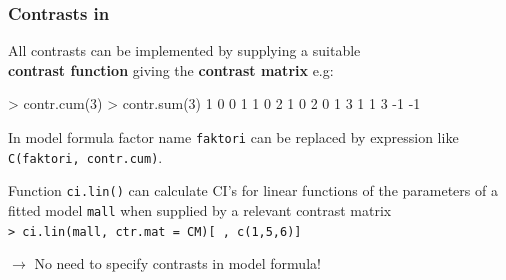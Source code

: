 \documentclass[12pt,dvipsnames,t,handout%
,aspectratio=169%
]{beamer}
\begin{document}
\begin{frame}[fragile]

\frametitle{Contrasts in \R}

\bi
\item
All contrasts can be implemented by supplying a suitable  \\
{\bf contrast function} giving the {\bf contrast matrix} e.g:
{\small
\begin{semiverbatim}
{> contr.cum(3)}        {> contr.sum(3)}
1 0 0                  1    1   0    
2 1 0                  2    0   1   
3 1 1                  3   -1  -1   
\end{semiverbatim}
}
\medskip
\item
In model formula factor name {\tt faktori} can be replaced by expression
like \verb+C(faktori, contr.cum)+.
\medskip
\item 
Function \texttt{ci.lin()} can calculate CI's for
linear functions of the parameters of a fitted
model {\tt mall} when supplied by a relevant contrast matrix \\
\verb|> ci.lin(mall, ctr.mat = CM)[ , c(1,5,6)]|

\medskip
$\to$ No need to specify contrasts in model formula!
\ei
\end{frame}
\end{document}
